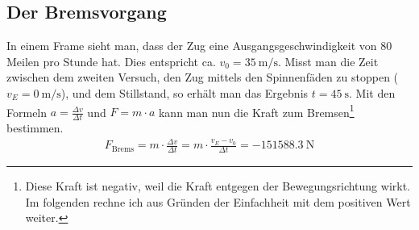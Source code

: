 \documentclass[a4paper, 11pt, nofonts, 
twoside, sfsidenotes, nobib, justified]{tufte-handout}
\begin{document}
\subsection{Der Bremsvorgang}
In einem Frame sieht man, dass der Zug eine Ausgangsgeschwindigkeit von 80 Meilen pro Stunde hat. Dies entspricht ca. $v_0=\SI{35}{\meter\per\second}$. \cite{WSem02} Misst man die Zeit zwischen dem zweiten Versuch, den Zug mittels den Spinnenfäden zu stoppen ($v_E=\SI{0}{\meter\per\second}$), und dem Stillstand, so erhält man das Ergebnis $t=\SI{45}{\second}$. Mit den Formeln $a=\frac{\Delta v}{\Delta t}$ und $F = m\cdot a$ kann man nun die Kraft zum Bremsen\footnote{Diese Kraft ist negativ, weil die Kraft entgegen der Bewegungsrichtung wirkt. Im folgenden rechne ich aus Gründen der Einfachheit mit dem positiven Wert weiter.} bestimmen.
\begin{align*}
	F_\text{Brems} = m \cdot \frac{\Delta v}{\Delta t} = m \cdot \frac{v_E -v_0}{\Delta t} = \SI{-151588.3}{\newton}
\end{align*}
\end{document}
